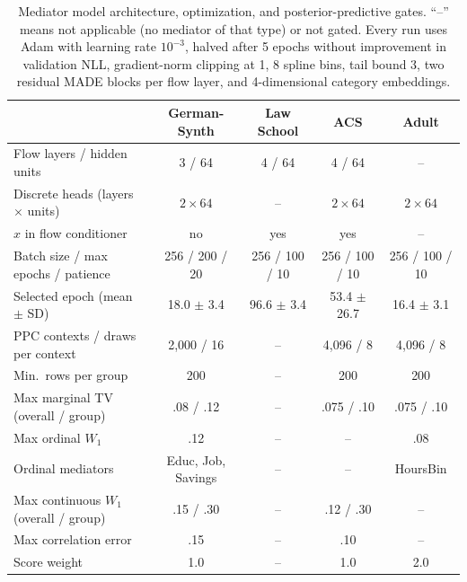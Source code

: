 \begin{table}[h]
\centering
\small
\caption{Mediator model architecture, optimization, and
posterior-predictive gates. ``--'' means not applicable (no mediator of that
type) or not gated. Every run uses Adam with learning rate $10^{-3}$, halved
after 5 epochs without improvement in validation NLL, gradient-norm clipping
at 1, 8 spline bins, tail bound 3, two residual MADE blocks per flow layer,
and 4-dimensional category embeddings.}
\label{tab:flow_hparams}
\setlength{\tabcolsep}{4pt}
\begin{tabular}{lcccc}
\hline
& German-Synth & Law School & ACS & Adult \\
\hline
Flow layers / hidden units          & 3 / 64 & 4 / 64 & 4 / 64 & -- \\
Discrete heads (layers $\times$ units) & $2\times64$ & -- & $2\times64$ & $2\times64$ \\
$x$ in flow conditioner             & no & yes & yes & -- \\
Batch size / max epochs / patience  & 256 / 200 / 20 & 256 / 100 / 10 & 256 / 100 / 10 & 256 / 100 / 10 \\
Selected epoch (mean $\pm$ SD)      & 18.0 $\pm$ 3.4 & 96.6 $\pm$ 3.4 & 53.4 $\pm$ 26.7 & 16.4 $\pm$ 3.1 \\
\hline
PPC contexts / draws per context    & 2{,}000 / 16 & -- & 4{,}096 / 8 & 4{,}096 / 8 \\
Min.\ rows per group                & 200 & -- & 200 & 200 \\
Max marginal TV (overall / group)   & .08 / .12 & -- & .075 / .10 & .075 / .10 \\
Max ordinal $W_1$                   & .12 & -- & -- & .08 \\
Ordinal mediators                   & Educ, Job, Savings & -- & -- & HoursBin \\
Max continuous $W_1$ (overall / group) & .15 / .30 & -- & .12 / .30 & -- \\
Max correlation error               & .15 & -- & .10 & -- \\
Score weight                        & 1.0 & -- & 1.0 & 2.0 \\
\hline
\end{tabular}
\end{table}


